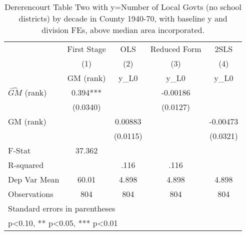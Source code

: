 \begin{table}[htbp]\centering
\def\sym#1{\ifmmode^{#1}\else\(^{#1}\)\fi}
\caption{Dererencourt Table Two with y=Number of Local Govts (no school districts) by decade in County 1940-70, with baseline y and division FEs, above median area incorporated.}
\begin{tabular}{l*{4}{c}}
\toprule
                    & First Stage   &         OLS   &Reduced Form   &        2SLS   \\
                    &\multicolumn{1}{c}{(1)}&\multicolumn{1}{c}{(2)}&\multicolumn{1}{c}{(3)}&\multicolumn{1}{c}{(4)}\\
                    &\multicolumn{1}{c}{GM  (rank)}&\multicolumn{1}{c}{y\_L0}&\multicolumn{1}{c}{y\_L0}&\multicolumn{1}{c}{y\_L0}\\
\midrule
$\hat{GM}$ (rank)   &       0.394***&               &    -0.00186   &               \\
                    &    (0.0340)   &               &    (0.0127)   &               \\
\addlinespace
GM  (rank)          &               &     0.00883   &               &    -0.00473   \\
                    &               &    (0.0115)   &               &    (0.0321)   \\
\midrule
F-Stat              &      37.362   &               &               &               \\
R-squared           &               &        .116   &        .116   &               \\
Dep Var Mean        &       60.01   &       4.898   &       4.898   &       4.898   \\
Observations        &         804   &         804   &         804   &         804   \\
\bottomrule
\multicolumn{5}{l}{\footnotesize Standard errors in parentheses}\\
\multicolumn{5}{l}{\footnotesize * p<0.10, ** p<0.05, *** p<0.01}\\
\end{tabular}
\end{table}
